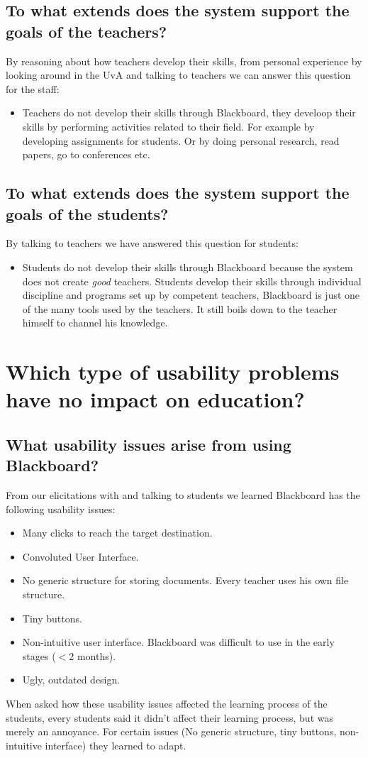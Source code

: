 \subsection{To what extends does the system support the goals of the teachers?}
By reasoning about how teachers develop their skills, from personal experience by looking around in the UvA and talking to teachers we can answer this question for the staff:
\begin{itemize}
	\item Teachers do not develop their skills through Blackboard, they develoop their skills by performing activities related to their field. For example by developing assignments for students. Or by doing personal research, read papers, go to conferences etc.
\end{itemize}

\subsection{To what extends does the system support the goals of the students?}
By talking to teachers we have answered this question for students:
\begin{itemize}
	\item Students do not develop their skills through Blackboard because the system does not create \emph{good} teachers. Students develop their skills through individual discipline and programs set up by competent teachers, Blackboard is just one of the many tools used by the teachers. It still boils down to the teacher himself to channel his knowledge.
\end{itemize}

\section{Which type of usability problems have no impact on education?}\label{s_1}
\subsection{What usability issues arise from using Blackboard?}
From our elicitations with and talking to students we learned Blackboard has the following usability issues:
\begin{itemize}
	\item Many clicks to reach the target destination.
	\item Convoluted User Interface.
	\item No generic structure for storing documents. Every teacher uses his own file structure.
	\item Tiny buttons.
	\item Non-intuitive user interface. Blackboard was difficult to use in the early stages ($<$2 months).
	\item Ugly, outdated design.
\end{itemize}
When asked how these usability issues affected the learning process of the students, every students said it didn't affect their learning process, but was merely an annoyance. For certain issues (No generic structure, tiny buttons, non-intuitive interface) they learned to adapt.

